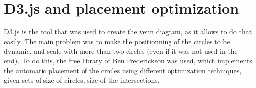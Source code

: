 \section{D3.js and placement optimization}
D3.js is the tool that was used to create the venn diagram, as it allows to do that easily. The main problem was to make the positionning of the circles to be dynamic, and scale with more than two circles (even if it was not used in the end). To do this, the free library of Ben Frederickson was used, which implements the automatic placement of the circles using different optimization techniques, given sets of size of circles, size of the intersections.\\